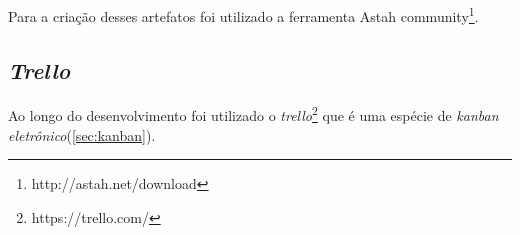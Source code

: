       Para a criação desses artefatos foi utilizado a ferramenta Astah community\footnote{http://astah.net/download}.


    \subsection{\textit{Trello}}\label{sub:trello}
      Ao longo do desenvolvimento foi utilizado o \textit{trello}\footnote{https://trello.com/}  que é uma espécie de \textit{kanban eletrônico}(\ref{sec:kanban}).

